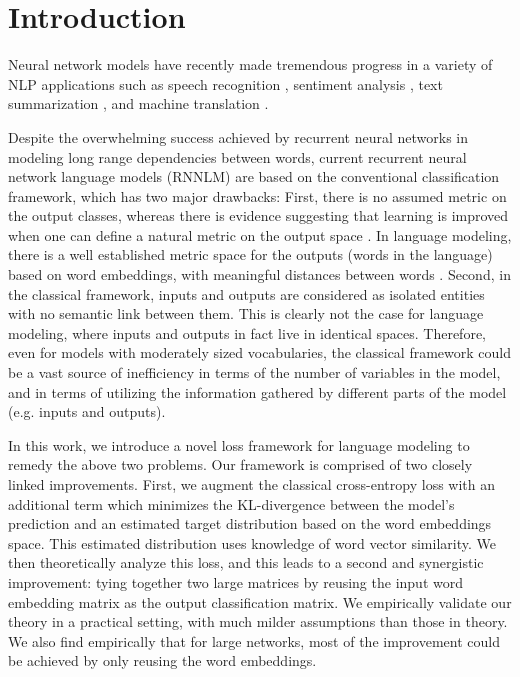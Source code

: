 \section{Introduction}
Neural network models have recently made tremendous progress in a variety of NLP applications such as speech recognition \citep{irie2016lstm}, sentiment analysis \citep{socher2013recursive},
text summarization \citep{rush2015neural,nallapatiabstractive}, and machine translation \citep{firat2016multi}.

Despite the overwhelming success achieved by recurrent neural networks in modeling long range dependencies between words, current recurrent neural network language models (RNNLM) are based on the conventional classification framework, which has two major drawbacks:
First, there is no assumed metric on the output classes, whereas there is evidence suggesting that learning is improved when one can define a natural metric on the output space \citep{frogner2015learning}.
In language modeling, there is a well established metric space for the outputs (words in the language) based on word embeddings, with meaningful distances between words \citep{mikolov2013distributed,pennington2014glove}.
Second, in the classical framework, inputs and outputs are considered as isolated entities with no semantic link between them. This is clearly not the case for language modeling, where inputs and outputs in fact live in identical spaces.
Therefore, even for models with moderately sized vocabularies, the classical framework could be a vast source of inefficiency in terms of the number of variables in the model, and in terms of utilizing the information gathered by different parts of the model (e.g. inputs and outputs).

In this work, we introduce a novel loss framework for language modeling to remedy the above two problems.
Our framework is comprised of two closely linked improvements.
First, we augment the classical cross-entropy loss with an additional term which minimizes the KL-divergence between the model's prediction and an estimated target distribution based on the word embeddings space.
This estimated distribution uses knowledge of word vector similarity.
We then theoretically analyze this loss, and this leads to a second and synergistic improvement: tying together two large matrices by reusing the input word embedding matrix as the output classification matrix.
We empirically validate our theory in a practical setting, with much milder assumptions than those in theory. 
We also find empirically that for large networks, most of the improvement could be achieved by only reusing the word embeddings.

